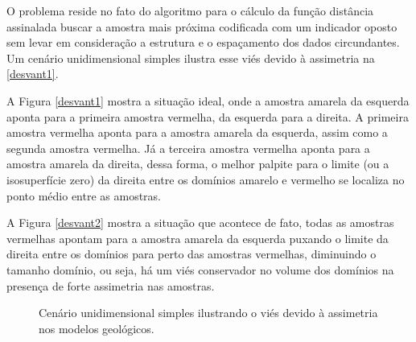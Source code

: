 O problema reside no fato do algoritmo para o cálculo da função distância assinalada buscar a amostra mais próxima codificada com um indicador oposto sem levar em consideração a estrutura e o espaçamento dos dados circundantes. Um cenário unidimensional simples ilustra esse viés devido à assimetria na \autoref{desvant1}. 

A Figura \autoref{desvant1} mostra a situação ideal, onde a amostra amarela da esquerda aponta para a primeira amostra vermelha, da esquerda para a direita. A primeira amostra vermelha aponta para a amostra amarela da esquerda, assim como a segunda amostra vermelha. Já a terceira amostra vermelha aponta para a amostra amarela da direita, dessa forma, o melhor palpite para o limite (ou a isosuperfície zero) da direita entre os domínios amarelo e vermelho se localiza no ponto médio entre as amostras. 

A Figura \autoref{desvant2} mostra a situação que acontece de fato, todas as amostras vermelhas apontam para a amostra amarela da esquerda puxando o limite da direita entre os domínios para perto das amostras vermelhas, diminuindo o tamanho domínio, ou seja, há um viés conservador no volume dos domínios na presença de forte assimetria nas amostras.

\begin{figure}[H] 
    \centering
    \caption{Cenário unidimensional simples ilustrando o viés devido à assimetria nos modelos geológicos.} \label{desvant1}
     \hspace{1em}
\end{figure}

